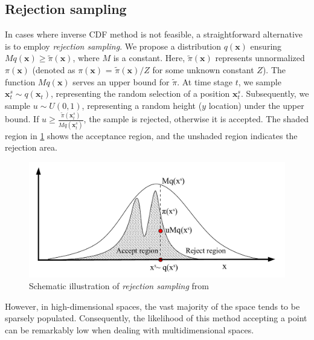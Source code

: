 \subsection{Rejection sampling}
In cases where inverse \acrshort{CDF} method is not feasible, a straightforward alternative is to employ \textit{rejection sampling}. We propose a distribution $q(\boldsymbol{x})$ ensuring $Mq(\boldsymbol{x}) \geq \tilde{\pi}(\boldsymbol{x})$, where $M$ is a constant. Here, $\tilde{\pi}(\boldsymbol{x})$ represents unnormalized $\pi(\boldsymbol{x})$ (denoted as $\pi(\boldsymbol{x})$ = $\tilde{\pi}(\boldsymbol{x})/Z$ for some unknown constant $Z$). The function $Mq(\boldsymbol{x})$ serves an upper bound for $\tilde{\pi}$. At time stage $t$, we sample $\boldsymbol{x}_{t}^{s} \sim q(\boldsymbol{x}_{t})$, representing the random selection of a position $\boldsymbol{x}_{t}^{s}$. Subsequently, we sample $u \sim U(0,1)$, representing a random height ($y$ location) under the
upper bound. If $u \geq \frac{\tilde{\pi}(\boldsymbol{x}_{t}^{s})}{Mq(\boldsymbol{x}_{t}^{s})}$, the sample is rejected, otherwise it is accepted. The shaded region in \cref{fig: rejectsampling} shows the acceptance region, and the unshaded region indicates the rejection area.
\begin{figure}[htbp]
    \centering
    \includegraphics[width = 140mm]{Figures/figure-rejectionsampling.pdf}
\caption{Schematic illustration of \textit{rejection sampling} from \protect\cite{andrieu2003}}
\label{fig: rejectsampling}
\end{figure}
However, in high-dimensional spaces, the vast majority of the space tends to be sparsely populated. Consequently, the likelihood of this method accepting a point can be remarkably low when dealing with multidimensional spaces.
